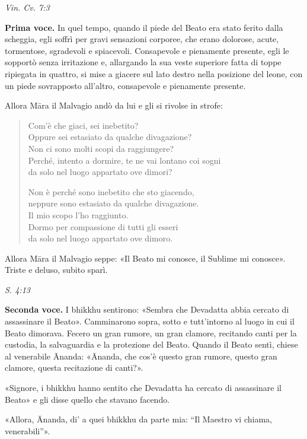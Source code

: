 \emph{Vin. Cv. 7:3}


\textbf{Prima voce.} In quel tempo, quando il piede del Beato era stato ferito
dalla scheggia, egli soffrì per gravi sensazioni corporee, che erano
dolorose, acute, tormentose, sgradevoli e spiacevoli. Consapevole e
pienamente presente, egli le sopportò senza irritazione e, allargando la
sua veste superiore fatta di toppe ripiegata in quattro, si mise a
giacere sul lato destro nella posizione del leone, con un piede
sovrapposto all’altro, consapevole e pienamente presente.


Allora Māra il Malvagio andò da lui e gli si rivolse in strofe:


\begin{quotation}
Com’è che giaci, sei inebetito? \\
Oppure sei estasiato da qualche divagazione? \\
Non ci sono molti scopi da raggiungere? \\
Perché, intento a dormire, te ne vai lontano coi sogni \\
da solo nel luogo appartato ove dimori?


Non è perché sono inebetito che sto giacendo, \\
neppure sono estasiato da qualche divagazione. \\
Il mio scopo l’ho raggiunto. \\
Dormo per compassione di tutti gli esseri \\
da solo nel luogo appartato ove dimoro.
\end{quotation}

Allora Māra il Malvagio seppe: «Il Beato mi conosce, il Sublime mi
conosce». Triste e deluso, subito sparì.


\emph{S. 4:13}


\textbf{Seconda voce.} I bhikkhu sentirono: «Sembra che Devadatta abbia cercato
di assassinare il Beato». Camminarono sopra, sotto e tutt’intorno al
luogo in cui il Beato dimorava. Fecero un gran rumore, un gran clamore,
recitando canti per la custodia, la salvaguardia e la protezione del
Beato. Quando il Beato sentì, chiese al venerabile Ānanda: «Ānanda, che
cos’è questo gran rumore, questo gran clamore, questa recitazione di
canti?».


«Signore, i bhikkhu hanno sentito che Devadatta ha cercato di
assassinare il Beato» e gli disse quello che stavano facendo.


«Allora, Ānanda, di' a quei bhikkhu da parte mia: “Il Maestro vi chiama,
venerabili”».


